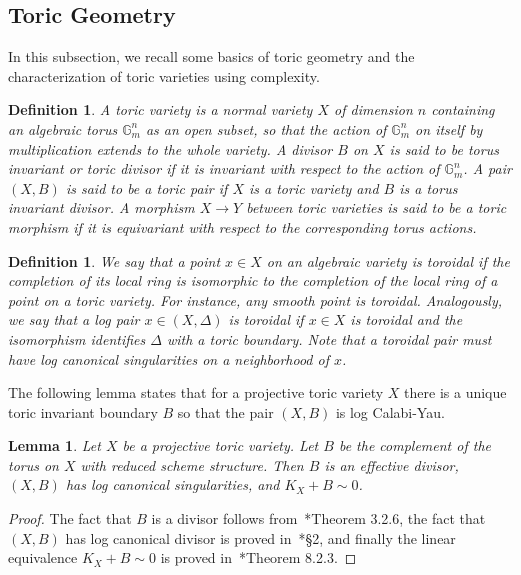 \documentclass{amsart}
\newtheorem{lemma}[theorem]{Lemma}
\newtheorem{definition}[theorem]{Definition}
\theoremstyle{remark}
\numberwithin{equation}{section}
\begin{document}
\subsection{Toric Geometry}\label{subsec:toric-geometry}
In this subsection, we recall some basics of toric geometry and the characterization of toric varieties using complexity.

\begin{definition}{\em 
A {\em toric variety} is a normal variety $X$
of dimension $n$
containing an algebraic torus $\mathbb{G}_m^n$ as an open subset, 
so that the action of $\mathbb{G}_m^n$ on itself
by multiplication extends to the whole variety.
A divisor $B$ on $X$ is said to be {\em torus invariant} or
{\em toric divisor} if it is invariant with respect
to the action of $\mathbb{G}_m^n$.
A pair $(X,B)$ is said to be a {\em toric pair}
if $X$ is a toric variety and $B$ is a torus invariant divisor.
A morphism $X\rightarrow Y$ between toric varieties is said to be {\em a toric morphism}
if it is equivariant with respect to the corresponding torus actions.
}
\end{definition}

\begin{definition}
{\em 
We say that a point $x\in X$ on an algebraic variety is {\em toroidal} if the completion of its local ring is isomorphic to the completion of the local ring of a point on a toric variety.
For instance, any smooth point is toroidal.
Analogously, we say that a log pair $x\in (X,\Delta)$ is {\em toroidal} if $x\in X$ is toroidal and
the isomorphism identifies $\Delta$ with a toric boundary.
Note that a toroidal pair must have log canonical singularities on a neighborhood of $x$.
}
\end{definition}

The following lemma states that for a projective toric variety $X$ there is a unique toric invariant boundary $B$ so that the pair $(X,B)$ is log Calabi-Yau.

\begin{lemma}\label{lem:unique-tlcy}
Let $X$ be a projective toric variety.
Let $B$ be the complement of the torus on $X$ with reduced scheme structure.
Then $B$ is an effective divisor,
$(X,B)$ has log canonical singularities, 
and $K_X+B\sim 0$.
\end{lemma}

\begin{proof}
The fact that $B$ is a divisor follows from~\cite{CLS11}*{Theorem 3.2.6},
the fact that $(X,B)$ has log canonical divisor is proved in~\cite{Amb06}*{\S 2}, 
and finally the linear equivalence
$K_X+B\sim 0$ is proved in~\cite{CLS11}*{Theorem 8.2.3}.
\end{proof}
\end{document}
